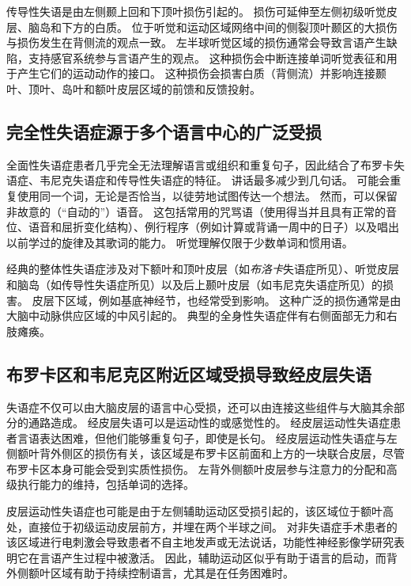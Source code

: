 传导性失语是由左侧颞上回和下顶叶损伤引起的。
损伤可延伸至左侧初级听觉皮层、脑岛和下方的白质。
位于听觉和运动区域网络中间的侧裂顶叶颞区的大损伤与损伤发生在背侧流的观点一致。
左半球听觉区域的损伤通常会导致言语产生缺陷，支持感官系统参与言语产生的观点。
这种损伤会中断连接单词听觉表征和用于产生它们的运动动作的接口。
这种损伤会损害白质（背侧流）并影响连接颞叶、顶叶、岛叶和额叶皮层区域的前馈和反馈投射。



\subsection{完全性失语症源于多个语言中心的广泛受损}

全面性失语症患者几乎完全无法理解语言或组织和重复句子，因此结合了布罗卡失语症、韦尼克失语症和传导性失语症的特征。
讲话最多减少到几句话。
可能会重复使用同一个词，无论是否恰当，以徒劳地试图传达一个想法。
然而，可以保留非故意的（“自动的”）语音。
这包括常用的咒骂语（使用得当并且具有正常的音位、语音和屈折变化结构）、例行程序（例如计算或背诵一周中的日子）以及唱出以前学过的旋律及其歌词的能力。
听觉理解仅限于少数单词和惯用语。


经典的整体性失语症涉及对下额叶和顶叶皮层（如\textit{布洛卡}失语症所见）、听觉皮层和脑岛（如传导性失语症所见）以及后上颞叶皮层（如韦尼克失语症所见）的损害。
皮层下区域，例如基底神经节，也经常受到影响。
这种广泛的损伤通常是由大脑中动脉供应区域的中风引起的。
典型的全身性失语症伴有右侧面部无力和右肢瘫痪。



\subsection{布罗卡区和韦尼克区附近区域受损导致经皮层失语}

失语症不仅可以由大脑皮层的语言中心受损，还可以由连接这些组件与大脑其余部分的通路造成。
经皮层失语可以是运动性的或感觉性的。
经皮层运动性失语症患者言语表达困难，但他们能够重复句子，即使是长句。
经皮层运动性失语症与左侧额叶背外侧区的损伤有关，该区域是布罗卡区前面和上方的一块联合皮层，尽管布罗卡区本身可能会受到实质性损伤。
左背外侧额叶皮层参与注意力的分配和高级执行能力的维持，包括单词的选择。


皮层运动性失语症也可能是由于左侧辅助运动区受损引起的，该区域位于额叶高处，直接位于初级运动皮层前方，并埋在两个半球之间。
对非失语症手术患者的该区域进行电刺激会导致患者不自主地发声或无法说话，功能性神经影像学研究表明它在言语产生过程中被激活。
因此，辅助运动区似乎有助于语言的启动，而背外侧额叶区域有助于持续控制语言，尤其是在任务困难时。


